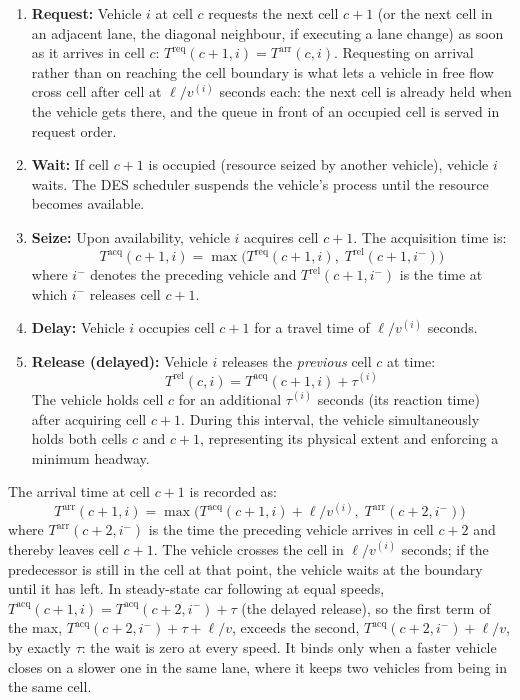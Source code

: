 \documentclass[review,number]{elsarticle}
\newcommand{\Treq}{T^{\text{req}}}
\newcommand{\Tacq}{T^{\text{acq}}}
\newcommand{\Tarr}{T^{\text{arr}}}
\newcommand{\Trel}{T^{\text{rel}}}
\begin{document}
\begin{enumerate}
    \item \textbf{Request:} Vehicle $i$ at cell $c$ requests the next cell $c+1$ (or the next cell in an adjacent lane, the diagonal neighbour, if executing a lane change) as soon as it arrives in cell $c$: $\Treq(c+1, i) = \Tarr(c, i)$. Requesting on arrival rather than on reaching the cell boundary is what lets a vehicle in free flow cross cell after cell at $\ell / v^{(i)}$ seconds each: the next cell is already held when the vehicle gets there, and the queue in front of an occupied cell is served in request order.

    \item \textbf{Wait:} If cell $c+1$ is occupied (resource seized by another vehicle), vehicle $i$ waits. The DES scheduler suspends the vehicle's process until the resource becomes available.

    \item \textbf{Seize:} Upon availability, vehicle $i$ acquires cell $c+1$. The acquisition time is:
    \begin{equation}
        \Tacq(c+1, i) = \max\!\big(\Treq(c+1, i),\; \Trel(c+1, i^{-})\big)
        \label{eq:acquisition}
    \end{equation}
    where $i^{-}$ denotes the preceding vehicle and $\Trel(c+1, i^{-})$ is the time at which $i^{-}$ releases cell $c+1$.

    \item \textbf{Delay:} Vehicle $i$ occupies cell $c+1$ for a travel time of $\ell / v^{(i)}$ seconds.

    \item \textbf{Release (delayed):} Vehicle $i$ releases the \emph{previous} cell $c$ at time:
    \begin{equation}
        \Trel(c, i) = \Tacq(c+1, i) + \tau^{(i)}
        \label{eq:delayed_release}
    \end{equation}
    The vehicle holds cell $c$ for an additional $\tau^{(i)}$ seconds (its reaction time) after acquiring cell $c+1$. During this interval, the vehicle simultaneously holds both cells $c$ and $c+1$, representing its physical extent and enforcing a minimum headway.
\end{enumerate}

The arrival time at cell $c+1$ is recorded as:
\begin{equation}
    \Tarr(c+1, i) = \max\!\big(\Tacq(c+1, i) + \ell / v^{(i)},\; \Tarr(c+2, i^{-})\big)
    \label{eq:arrival}
\end{equation}
where $\Tarr(c+2, i^{-})$ is the time the preceding vehicle arrives in cell $c+2$ and thereby leaves cell $c+1$. The vehicle crosses the cell in $\ell / v^{(i)}$ seconds; if the predecessor is still in the cell at that point, the vehicle waits at the boundary until it has left. In steady-state car following at equal speeds, $\Tacq(c+1, i) = \Tacq(c+2, i^{-}) + \tau$ (the delayed release), so the first term of the max, $\Tacq(c+2, i^{-}) + \tau + \ell/v$, exceeds the second, $\Tacq(c+2, i^{-}) + \ell/v$, by exactly $\tau$: the wait is zero at every speed. It binds only when a faster vehicle closes on a slower one in the same lane, where it keeps two vehicles from being in the same cell.
\end{document}
